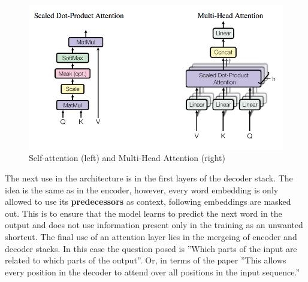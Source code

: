 \documentclass[draft,final]{vutinfth} %
\begin{document}
\begin{figure}
    \centering
    \includegraphics[width=1.0\linewidth]{thesis-figures/Attention.png}
    \caption{Self-attention (left) and Multi-Head Attention (right) \cite[p. 4]{vaswani_attention_2017}}
    \label{fig:paying-attention}
\end{figure}
The next use in the architecture is in the first layers of the decoder stack. The idea is the same as in the encoder, however, every word embedding is only allowed to use its \textbf{predecessors} as context, following embeddings are masked out. This is to ensure that the model learns to predict the next word in the output and does not use information present only in the training as an unwanted shortcut. The final use of an attention layer lies in the mergeing of encoder and decoder stacks. In this case  the question posed is ''Which parts of the input are related to which parts of the output''. Or, in terms of the paper ''This allows every position in the decoder to attend over all positions in the input sequence.'' \cite[p. 5]{vaswani_attention_2017}
\end{document}
